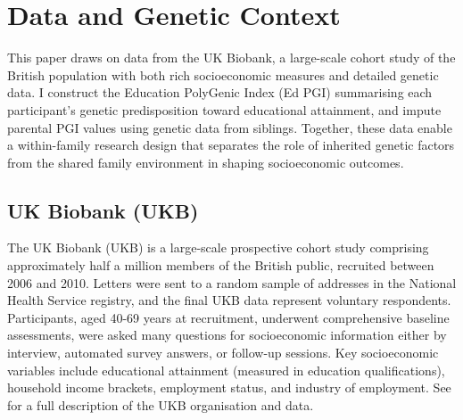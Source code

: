 \section{Data and Genetic Context}
\label{sec:data}
This paper draws on data from the UK Biobank, a large-scale cohort study of the British population with both rich socioeconomic measures and detailed genetic data.
I construct the Education PolyGenic Index (Ed PGI) summarising each participant's genetic predisposition toward educational attainment, and impute parental PGI values using genetic data from siblings.
Together, these data enable a within-family research design that separates the role of inherited genetic factors from the shared family environment in shaping socioeconomic outcomes.

\subsection{UK Biobank (UKB)}
\label{sec:data-UKB}
The UK Biobank (UKB) is a large-scale prospective cohort study comprising approximately half a million members of the British public, recruited between 2006 and 2010.
Letters were sent to a random sample of addresses in the National Health Service registry, and the final UKB data represent voluntary respondents.
Participants, aged 40-69 years at recruitment, underwent comprehensive baseline assessments, were asked many questions for socioeconomic information either by interview, automated survey answers, or follow-up sessions.
Key socioeconomic variables include educational attainment (measured in education qualifications), household income brackets, employment status, and industry of employment.
See \cite{sudlow2015uk} for a full description of the UKB organisation and data.

